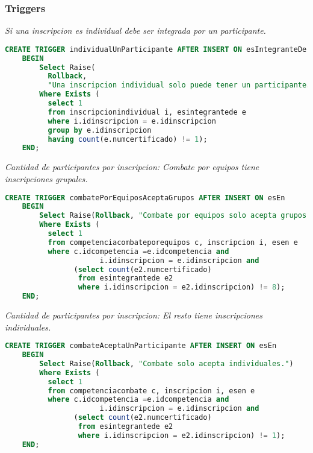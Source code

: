 \subsubsection{Triggers}

\emph{Si una inscripcion es individual debe ser integrada por un participante.}

\begin{lstlisting}[language=SQL]
CREATE TRIGGER individualUnParticipante AFTER INSERT ON esIntegranteDe
    BEGIN
        Select Raise(
          Rollback,
          "Una inscripcion individual solo puede tener un participante.")
        Where Exists (
          select 1
          from inscripcionindividual i, esintegrantede e
          where i.idinscripcion = e.idinscripcion
          group by e.idinscripcion
          having count(e.numcertificado) != 1);
    END;
\end{lstlisting}

\emph{Cantidad de participantes por inscripcion: Combate por equipos tiene inscripciones grupales.}

\begin{lstlisting}[language=SQL]
CREATE TRIGGER combatePorEquiposAceptaGrupos AFTER INSERT ON esEn
    BEGIN
        Select Raise(Rollback, "Combate por equipos solo acepta grupos.")
        Where Exists (
          select 1
          from competenciacombateporequipos c, inscripcion i, esen e
          where c.idcompetencia =e.idcompetencia and
                      i.idinscripcion = e.idinscripcion and
                (select count(e2.numcertificado)
                 from esintegrantede e2
                 where i.idinscripcion = e2.idinscripcion) != 8);
    END;
\end{lstlisting}

\emph{Cantidad de participantes por inscripcion: El resto tiene inscripciones individuales.}

\begin{lstlisting}[language=SQL]
CREATE TRIGGER combateAceptaUnParticipante AFTER INSERT ON esEn
    BEGIN
        Select Raise(Rollback, "Combate solo acepta individuales.")
        Where Exists (
          select 1
          from competenciacombate c, inscripcion i, esen e
          where c.idcompetencia =e.idcompetencia and
                      i.idinscripcion = e.idinscripcion and
                (select count(e2.numcertificado)
                 from esintegrantede e2
                 where i.idinscripcion = e2.idinscripcion) != 1);
    END;
\end{lstlisting}

